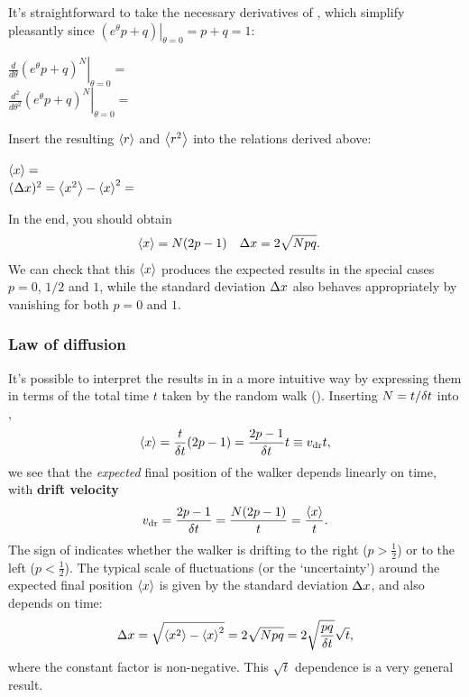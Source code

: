 \newpage %
It's straightforward to take the necessary derivatives of , which simplify pleasantly since $\left.\left(e^{\theta} p + q\right) \right|_{\theta = 0} = p + q = 1$:
\begin{mdframed}
  $\displaystyle \left.\frac{d}{d\theta} \left(e^{\theta} p + q\right)^N \right|_{\theta = 0} = $ \\[50 pt]
  $\displaystyle \left.\frac{d^2}{d\theta^2} \left(e^{\theta} p + q\right)^N \right|_{\theta = 0} = $ \\[75 pt]
\end{mdframed}
Insert the resulting $\left\langle r \right\rangle$ and $\left\langle r^2 \right\rangle$ into the relations derived above:
\begin{mdframed}
  $\left\langle x \right\rangle = $ \\[50 pt]
  $(\Delta x)^2 = \left\langle x^2 \right\rangle - \left\langle x \right\rangle^2 = $ \\[50 pt]
\end{mdframed}
In the end, you should obtain %
\begin{align}
  \label{eq:RWmean}
  \left\langle x \right\rangle & = N(2p - 1) &
  \Delta x & = 2\sqrt{Npq}.
\end{align}
We can check that this $\left\langle x \right\rangle$ produces the expected results in the special cases $p = 0$, $1 / 2$ and $1$, while the standard deviation $\Delta x$ also behaves appropriately by vanishing for both $p = 0$ and $1$.



\subsubsection{Law of diffusion}
It's possible to interpret the results in  in a more intuitive way by expressing them in terms of the total time $t$ taken by the random walk ().
Inserting $N = t / \delta t$ into ,
\begin{equation*}
  \left\langle x \right\rangle = \frac{t}{\delta t} (2p - 1) = \frac{2p - 1}{\delta t} t \equiv v_{\mathrm{dr}} t,
\end{equation*}
we see that the \textit{expected} final position of the walker depends linearly on time, with \textbf{drift velocity}
\begin{equation}
  v_{\mathrm{dr}} = \frac{2p - 1}{\delta t} = \frac{N(2p - 1)}{t} = \frac{\left\langle x \right\rangle}{t}.
\end{equation}
The sign of \vdr indicates whether the walker is drifting to the right ($p > \frac{1}{2}$) or to the left ($p < \frac{1}{2}$).
The typical scale of fluctuations (or the `uncertainty') around the expected final position $\left\langle x \right\rangle$ is given by the standard deviation $\Delta x$, and also depends on time:
\begin{equation*}
  \Delta x = \sqrt{\left\langle x^2 \right\rangle - \left\langle x \right\rangle^2} = 2\sqrt{Npq} = 2\sqrt{\frac{pq}{\delta t}} \sqrt{t},
\end{equation*}
where the constant factor is non-negative.
This $\sqrt{t}$ dependence is a very general result.

